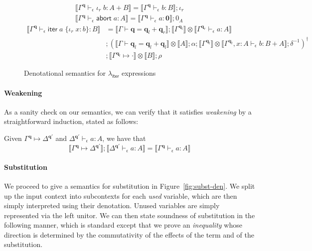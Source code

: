 \documentclass[acmsmall,screen,review]{acmart}
\newcommand{\mb}[1]{\ensuremath{\mathbf{#1}}}
\newcommand{\ms}[1]{\ensuremath{\mathsf{#1}}}
\newcommand{\lto}{:}
\newcommand{\linr}[1]{\iota_r\;{#1}}
\newcommand{\labort}[1]{\ms{abort}\;{#1}}
\newcommand{\liter}[3]{\ms{iter}\;#1\;\{ \linr{#2} \lto #3 \}}
\newcommand{\qsp}[4]{#1 \vdash #2 = #3 + #4}
\newcommand{\cwk}[2]{#1 \mapsto #2}
\newcommand{\hasty}[4]{#1 \vdash_{#2} #3: {#4}}
\newcommand{\dnt}[1]{\llbracket{#1}\rrbracket}
\newcommand{\subiterexp}{\texorpdfstring{\(\lambda_{\ms{iter}}\)}{lambda-iter}}
\begin{document}
\begin{figure}
\begin{adjustbox}{minipage=1.1\textwidth,scale=0.9}
\begin{gather*}
    \dnt{\hasty{\Gamma^{\mb{q}}}{\epsilon}{\linr{b}}{A + B}}
    = \dnt{\hasty{\Gamma^{\mb{q}}}{\epsilon}{b}{B}} ; \iota_r \\
    \dnt{\hasty{\Gamma^{\mb{q}}}{\epsilon}{\labort{a}}{A}}
    = \dnt{\hasty{\Gamma^{\mb{q}}}{\epsilon}{a}{\mb{0}}} ; 0_A
  \end{gather*}
  \begin{align*}
    \dnt{\hasty{\Gamma^{\mb{q}}}{\epsilon}{\liter{a}{x}{b}}{B}}
    &= 
    \dnt{\qsp{\Gamma}{\mb{q}}{\mb{q}_l}{\mb{q}_r}}
    ; \dnt{\Gamma^{\mb{q}_l}}
      \otimes \dnt{\hasty{\Gamma^{\mb{q}_r}}{\epsilon}{a}{A}} \\ &
    ; (
      \dnt{\qsp{\Gamma}{\mb{q}_l}{\mb{q}_l}{\mb{q}_l}} \otimes \dnt{A} 
      ; \alpha
      ; \dnt{\Gamma^{\mb{q}_l}} 
        \otimes \dnt{\hasty{\Gamma^{\mb{q}_l}, x : A}{\epsilon}{b}{B + A}}
      ; \delta^{-1}
    )^\dagger \\ &
    ; \dnt{\cwk{\Gamma^{\mb{q}_l}}{\cdot}} \otimes \dnt{B}
    ; \rho
  \end{align*}
  \end{adjustbox}
  \caption{Denotational semantics for \subiterexp{} expressions}
  \Description{}
  \label{fig:expr-densem}
\end{figure}

\paragraph{Weakening}

As a sanity check on our semantics, we can verify that it satisfies \emph{weakening} by a
straightforward induction, stated as follows:
\begin{lemma}[Weakening]
  Given $\cwk{\Gamma^{\mb{q}}}{\Delta^{\mb{q}'}}$ and
  $\hasty{\Delta^{\mb{q}'}}{\epsilon}{a}{A}$, we have that
  $$
  \dnt{\cwk{\Gamma^{\mb{q}}}{\Delta^{\mb{q}'}}} ; \dnt{\hasty{\Delta^{\mb{q}'}}{\epsilon}{a}{A}}
  = \dnt{\hasty{\Gamma^{\mb{q}}}{\epsilon}{a}{A}}
  $$
\end{lemma}

\paragraph{Substitution}

We proceed to give a semantics for substitution in Figure~\ref{fig:subst-den}. We split up the input
context into subcontexts for each \emph{used} variable, which are then simply interpreted using
their denotation. Unused variables are simply represented via the left unitor. We can then state
soundness of substitution in the following manner, which is standard except that we prove an
\emph{inequality} whose direction is determined by the commutativity of the effects of the term and
of the substitution. 
\end{document}
